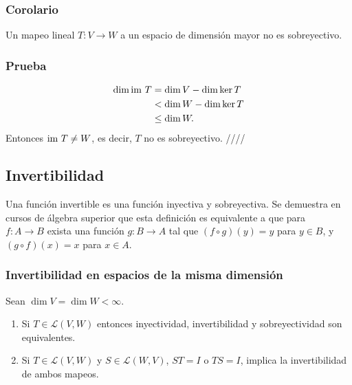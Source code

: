 \documentclass{article}
\begin{document}
\subsubsection{Corolario}
Un mapeo lineal $T: V\rightarrow W$ a un espacio de dimensión mayor
no es sobreyectivo.

\subsubsection*{Prueba}
\begin{align*}
    \dim\text{im } T &= \dim V - \dim\ker T\\
    &< \dim W - \dim\ker T \\
    &\leq \dim W.
\end{align*}
Entonces $\text{im } T \neq W$, es decir, $T$ no es sobreyectivo.
\hfill ////

\subsection{Invertibilidad}
Una función invertible es una función inyectiva y sobreyectiva.
Se demuestra en cursos de álgebra superior que esta definición es
equivalente a que para \\
$f:A\rightarrow B$ exista una función
$g:B\rightarrow A$ tal que $(f\circ g)(y) = y$ para $y\in B$,
y $(g\circ f)(x) = x$ para $x\in A$.
\newpage

\subsubsection{Invertibilidad en espacios de la misma dimensión}
Sean $\dim V = \dim W < \infty$.
\begin{enumerate}
    \item Si $T\in\mathcal{L}(V,W)$ entonces
    inyectividad, invertibilidad y sobreyectividad son equivalentes.
    \item Si $T\in\mathcal{L}(V,W)$ y $S\in\mathcal{L}(W,V)$,
    $ST=I$ o $TS=I$, implica la invertibilidad de ambos mapeos.
\end{enumerate}
\end{document}
